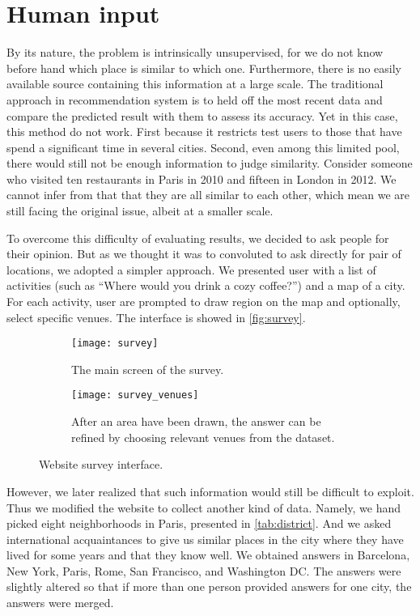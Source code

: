 \section{Human input}
\label{sec:user-study}

By its nature, the problem is intrinsically unsupervised, for we do not know
before hand which place is similar to which one. Furthermore, there is no
easily available source containing this information at a large scale. The
traditional approach in recommendation system is to held off the most recent
data and compare the predicted result with them to assess its accuracy.  Yet
in this case, this method do not work. First because it restricts test users
to those that have spend a significant time in several cities. Second, even
among this limited pool, there would still not be enough information to
judge similarity. Consider someone who visited ten restaurants in Paris in
2010 and fifteen in London in 2012. We cannot infer from that that they are
all similar to each other, which mean we are still facing the original issue,
albeit at a smaller scale.

To overcome this difficulty of evaluating results, we decided to ask people
for their opinion. But as we thought it was to convoluted to ask directly for
pair of locations, we adopted a simpler approach. We presented user with a
list of activities (such as \enquote{Where would you drink a cozy coffee?}) and
a map of a city. For each activity, user are prompted to draw region on the
map and optionally, select specific venues. The interface is showed in
\autoref{fig:survey}.

\begin{figure}[hbtp]
    \centering
    \begin{subfigure}[b]{\textwidth}
        \texttt{[image: survey]}
        \caption{The main screen of the survey.}
    \end{subfigure}

    \begin{subfigure}[b]{\textwidth}
        \texttt{[image: survey\_venues]}
        \caption{After an area have been drawn, the answer can be refined by
        choosing relevant venues from the dataset.}
    \end{subfigure}
    \caption{Website survey interface.\label{fig:survey}}
\end{figure}

However, we later realized that such information would still be difficult to
exploit. Thus we modified the website to collect another kind of data. Namely,
we hand picked eight neighborhoods in Paris, presented in
\autoref{tab:district}. And we asked international acquaintances to give us
similar places in the city where they have lived for some years and that they
know well. We obtained answers in Barcelona, New York, Paris, Rome, San
Francisco, and Washington DC. The answers were slightly altered so that if more
than one person provided answers for one city, the answers were merged.

